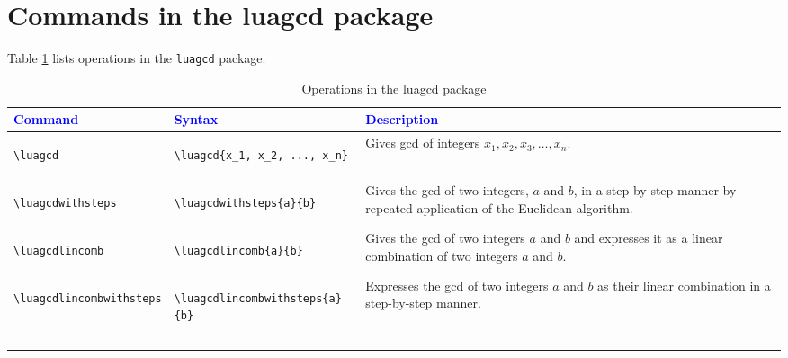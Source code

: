\documentclass{article}
\begin{document}
\section{Commands in the luagcd package}
Table \ref{tbl:luagcd} lists operations in the \verb|luagcd| package.
\begin{longtable}{m{4cm}m{5cm}m{4cm}}
\toprule
\multicolumn{1}{l}{\textcolor{blue}{Command}} & \multicolumn{1}{l}{\textcolor{blue}{Syntax}} & \multicolumn{1}{l}{\textcolor{blue}{Description}}  \\
\toprule
\begin{lstlisting}
\luagcd
\end{lstlisting} &
\begin{lstlisting}
\luagcd{x_1, x_2, ..., x_n}
\end{lstlisting} & Gives gcd of integers \(x_1,x_2,x_3,\ldots,x_n\).\\
\midrule
\begin{lstlisting}
\luagcdwithsteps
\end{lstlisting} &
\begin{lstlisting}
\luagcdwithsteps{a}{b}
\end{lstlisting} & Gives the gcd of two integers, \(a\) and \(b\), in a step-by-step manner by repeated application of the Euclidean algorithm. \\
\midrule
\begin{lstlisting}
\luagcdlincomb
\end{lstlisting} &
\begin{lstlisting}
\luagcdlincomb{a}{b}
\end{lstlisting} & Gives the gcd of two integers \(a\) and \(b\) and expresses it as a linear combination of two integers \(a\) and \(b\).  \\
\midrule
\begin{lstlisting}
\luagcdlincombwithsteps
\end{lstlisting} &
\begin{lstlisting}
\luagcdlincombwithsteps{a}{b}
\end{lstlisting} & Expresses  the gcd of two integers \(a\) and \(b\) as their linear combination in a step-by-step manner. \\ \\
\bottomrule

\caption{Operations in the luagcd package}
\label{tbl:luagcd}
\end{longtable}
\end{document}
